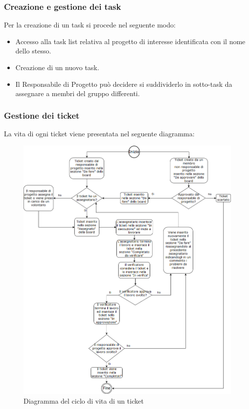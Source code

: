 \subsubsection{Creazione e gestione dei task}
Per la creazione di un task si procede nel seguente modo:
\begin{itemize}
    \item Accesso alla task list relativa al progetto di interesse identificata con il nome dello stesso.
    \item Creazione di un nuovo task.
    \item Il Responsabile di Progetto può decidere si suddividerlo in sotto-task da assegnare a membri del gruppo differenti.
\end{itemize}
\subsubsection{Gestione dei ticket}
La vita di ogni ticket viene presentata nel seguente diagramma:

\begin{figure}[h!]
  \begin{center}
  \includegraphics[scale=0.50]{immagini/Dt.png}
  \caption{Diagramma del ciclo di vita di un ticket}
  \end{center}
\end{figure}


